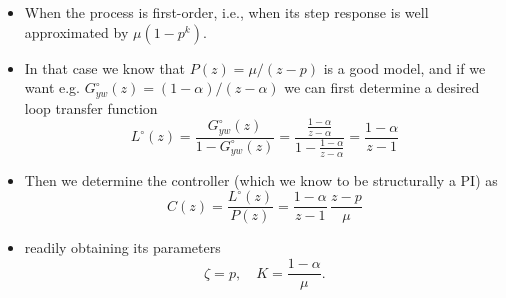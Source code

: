 \begin{frame}
\framesubtitleTC{}
\myPause
 \begin{itemize}[<+-| alert@+>]
 \item When the process is  first-order, i.e., when its step response is well approximated
       by $\mu(1-p^k)$.
 \item In that case we know that $P(z)=\mu/(z-p)$ is a good model, and if we want e.g.
       $G_{yw}^{\circ}(z)=(1-\alpha)/(z-\alpha)$ we can first determine a desired loop transfer function
       \begin{displaymath}
        L^{\circ}(z) = \frac{G_{yw}^{\circ}(z)}{1-G_{yw}^{\circ}(z)}
                     = \frac{\frac{1-\alpha}{z-\alpha}}{1-\frac{1-\alpha}{z-\alpha}}
                     = \frac{1-\alpha}{z-1}
       \end{displaymath}
 \item Then we determine the controller (which we know to be structurally a PI) as
       \begin{displaymath}
        C(z) = \frac{L^{\circ}(z)}{P(z)} = \frac{1-\alpha}{z-1}\,\frac{z-p}{\mu}
       \end{displaymath}
 \item[] readily obtaining its parameters
       \begin{displaymath}
        \zeta = p, \quad
        K     = \frac{1-\alpha}{\mu}.
       \end{displaymath}
 \end{itemize}
\end{frame}

